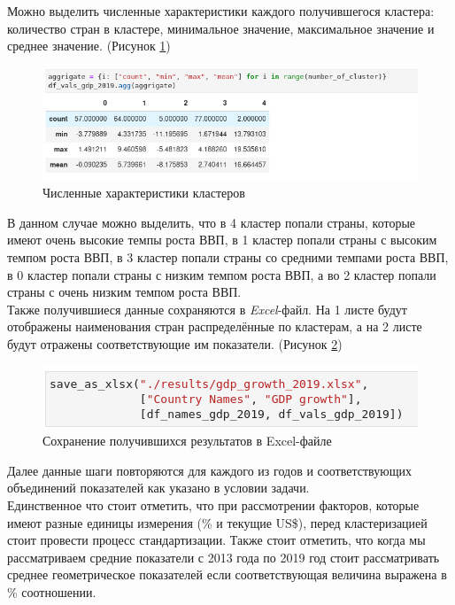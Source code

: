 \documentclass[14pt,fleqn]{extarticle}
\begin{document}
	\newpage
	
	Можно выделить численные характеристики каждого получившегося кластера: количество стран в кластере, минимальное значение, максимальное значение и среднее значение. (Рисунок \ref{fig:cluster_cluster_features})

	\begin{figure}[h]
		\centering \includegraphics[scale=0.6]{cluster_cluster_features}
		\caption{Численные характеристики кластеров}
		\label{fig:cluster_cluster_features}
	\end{figure}

	В данном случае можно выделить, что в 4 кластер попали страны, которые имеют очень высокие темпы роста ВВП, в 1 кластер попали страны с высоким темпом роста ВВП, в 3 кластер попали страны со средними темпами роста ВВП, в 0 кластер попали страны с низким темпом роста ВВП, а во 2 кластер попали страны с очень низким темпом роста ВВП.\\
	
	Также получившиеся данные сохраняются в \textit{Excel}-файл. На 1 листе будут отображены наименования стран распределённые по кластерам, а на 2 листе будут отражены соответствующие им показатели. (Рисунок \ref{fig:cluster_save_data})
	
	\begin{figure}[h]
		\centering \includegraphics[scale=0.6]{cluster_save_data}
		\caption{Сохранение получившихся результатов в Excel-файле}
		\label{fig:cluster_save_data}
	\end{figure}

	Далее данные шаги повторяются для каждого из годов и соответствующих объединений показателей как указано в условии задачи.\\
	
	Единственное что стоит отметить, что при рассмотрении факторов, которые имеют разные единицы измерения (\% и текущие US\$), перед кластеризацией стоит провести процесс стандартизации. Также стоит отметить, что когда мы рассматриваем средние показатели с 2013 года по 2019 год стоит рассматривать среднее геометрическое показателей если соответствующая величина выражена в \% соотношении.
	
\end{document}
